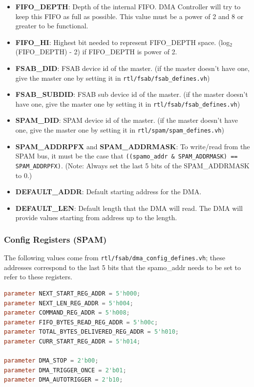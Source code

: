 \documentclass[10pt]{article}
\begin{document}
\begin{itemize}
\item{\textbf{FIFO\_DEPTH}: Depth of the internal FIFO. DMA Controller will
try to keep this FIFO as full as possible. This value must be a power of 2
and 8 or greater to be functional.}
\item{\textbf{FIFO\_HI}: Highest bit needed to represent FIFO\_DEPTH space.
(log${}_2$(FIFO\_DEPTH) - 2) if FIFO\_DEPTH is power of 2.}
\item{\textbf{FSAB\_DID}: FSAB device id of the master. (if the master
doesn't have one, give the master one by setting it in
\texttt{rtl/fsab/fsab\_defines.vh})}
\item{\textbf{FSAB\_SUBDID}: FSAB sub device id of the master. (if the
master doesn't have one, give the master one by setting it in
\texttt{rtl/fsab/fsab\_defines.vh})}
\item{\textbf{SPAM\_DID}: SPAM device id of the master. (if the master
doesn't have one, give the master one by setting it in
\texttt{rtl/spam/spam\_defines.vh})}

\item{\textbf{SPAM\_ADDRPFX} and \textbf{SPAM\_ADDRMASK}: To write/read from
the SPAM bus, it must be the case that \texttt{((spamo\_addr \& SPAM\_ADDRMASK) ==
SPAM\_ADDRPFX)}.  (Note: Always set the last 5 bits of the SPAM\_ADDRMASK to
0.)}

\item{\textbf{DEFAULT\_ADDR}: Default starting address for the DMA.}

\item{\textbf{DEFAULT\_LEN}: Default length that the DMA will read. The DMA will
provide values starting from address up to the length.}

\end{itemize}

\subsubsection{Config Registers (SPAM)}

The following values come from \texttt{rtl/fsab/dma\_config\_defines.vh};
these addresses correspond to the last 5 bits that the spamo\_addr needs to
be set to refer to these registers.

\begin{lstlisting}[basicstyle=\footnotesize,language=Verilog]
parameter NEXT_START_REG_ADDR = 5'h000;
parameter NEXT_LEN_REG_ADDR = 5'h004;
parameter COMMAND_REG_ADDR = 5'h008;
parameter FIFO_BYTES_READ_REG_ADDR = 5'h00c;
parameter TOTAL_BYTES_DELIVERED_REG_ADDR = 5'h010;
parameter CURR_START_REG_ADDR = 5'h014; 

parameter DMA_STOP = 2'b00;
parameter DMA_TRIGGER_ONCE = 2'b01;
parameter DMA_AUTOTRIGGER = 2'b10;
\end{lstlisting}
\end{document}
